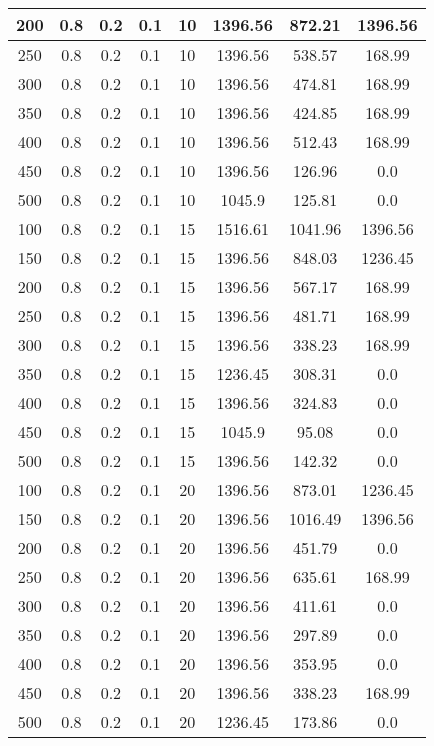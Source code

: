 \documentclass[a4paper, 12pt]{extreport}
\begin{document}
\begin{itemize}
\begin{longtable}{|c|c|c|c|c|c|c|c|}
			200 & 0.8 & 0.2 & 0.1 & 10 & 1396.56 & 872.21 & 1396.56 \\\hline
			250 & 0.8 & 0.2 & 0.1 & 10 & 1396.56 & 538.57 & 168.99 \\\hline
			300 & 0.8 & 0.2 & 0.1 & 10 & 1396.56 & 474.81 & 168.99 \\\hline
			350 & 0.8 & 0.2 & 0.1 & 10 & 1396.56 & 424.85 & 168.99 \\\hline
			400 & 0.8 & 0.2 & 0.1 & 10 & 1396.56 & 512.43 & 168.99 \\\hline
			450 & 0.8 & 0.2 & 0.1 & 10 & 1396.56 & 126.96 & 0.0 \\\hline
			500 & 0.8 & 0.2 & 0.1 & 10 & 1045.9 & 125.81 & 0.0 \\\hline
			100 & 0.8 & 0.2 & 0.1 & 15 & 1516.61 & 1041.96 & 1396.56 \\\hline
			150 & 0.8 & 0.2 & 0.1 & 15 & 1396.56 & 848.03 & 1236.45 \\\hline
			200 & 0.8 & 0.2 & 0.1 & 15 & 1396.56 & 567.17 & 168.99 \\\hline
			250 & 0.8 & 0.2 & 0.1 & 15 & 1396.56 & 481.71 & 168.99 \\\hline
			300 & 0.8 & 0.2 & 0.1 & 15 & 1396.56 & 338.23 & 168.99 \\\hline
			350 & 0.8 & 0.2 & 0.1 & 15 & 1236.45 & 308.31 & 0.0 \\\hline
			400 & 0.8 & 0.2 & 0.1 & 15 & 1396.56 & 324.83 & 0.0 \\\hline
			450 & 0.8 & 0.2 & 0.1 & 15 & 1045.9 & 95.08 & 0.0 \\\hline
			500 & 0.8 & 0.2 & 0.1 & 15 & 1396.56 & 142.32 & 0.0 \\\hline
			100 & 0.8 & 0.2 & 0.1 & 20 & 1396.56 & 873.01 & 1236.45 \\\hline
			150 & 0.8 & 0.2 & 0.1 & 20 & 1396.56 & 1016.49 & 1396.56 \\\hline
			200 & 0.8 & 0.2 & 0.1 & 20 & 1396.56 & 451.79 & 0.0 \\\hline
			250 & 0.8 & 0.2 & 0.1 & 20 & 1396.56 & 635.61 & 168.99 \\\hline
			300 & 0.8 & 0.2 & 0.1 & 20 & 1396.56 & 411.61 & 0.0 \\\hline
			350 & 0.8 & 0.2 & 0.1 & 20 & 1396.56 & 297.89 & 0.0 \\\hline
			400 & 0.8 & 0.2 & 0.1 & 20 & 1396.56 & 353.95 & 0.0 \\\hline
			450 & 0.8 & 0.2 & 0.1 & 20 & 1396.56 & 338.23 & 168.99 \\\hline
			500 & 0.8 & 0.2 & 0.1 & 20 & 1236.45 & 173.86 & 0.0 \\\hline

\end{longtable}
\end{itemize}
\end{document}
